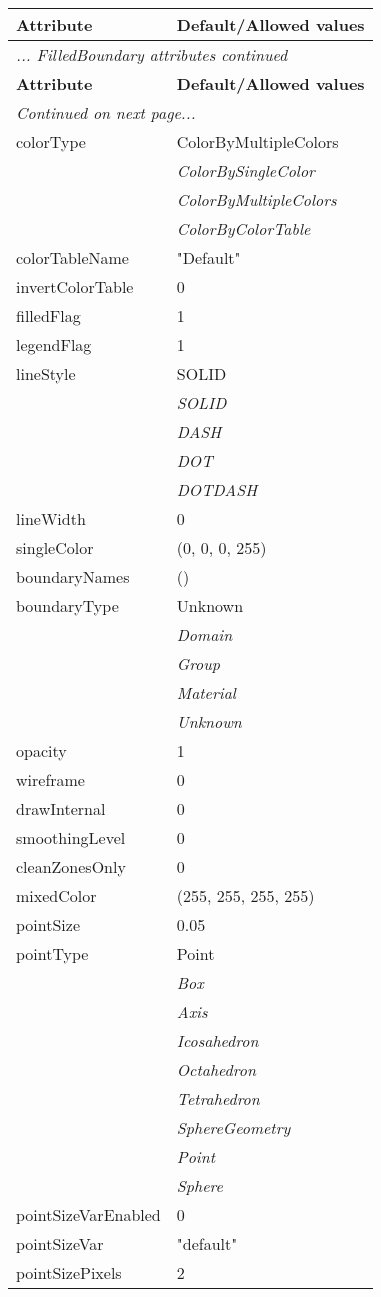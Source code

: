 \documentclass[10pt,a4paper]{report}
\begin{document}
\begin{longtable}{ll}
{\bf Attribute} & {\bf Default/Allowed values} \\
\hline \hline
\endfirsthead
\multicolumn{2}{l}{{\it ... FilledBoundary attributes continued}} \\
{\bf Attribute} & {\bf Default/Allowed values} \\
\hline \hline
\endhead
\hline
\multicolumn{2}{l}{{\it Continued on next page...}} \\
\endfoot
\hline
\endlastfoot

colorType  &  ColorByMultipleColors   \\
 & {\it  ColorBySingleColor} \\
 & {\it  ColorByMultipleColors} \\
 & {\it  ColorByColorTable} \\
colorTableName  &  "Default" \\
invertColorTable  &  0 \\
filledFlag  &  1 \\
legendFlag  &  1 \\
lineStyle  &  SOLID   \\
 & {\it  SOLID} \\
 & {\it  DASH} \\
 & {\it  DOT} \\
 & {\it  DOTDASH} \\
lineWidth  &  0 \\
singleColor  &  (0, 0, 0, 255) \\
boundaryNames  &  () \\
boundaryType  &  Unknown   \\
 & {\it  Domain} \\
 & {\it  Group} \\
 & {\it  Material} \\
 & {\it  Unknown} \\
opacity  &  1 \\
wireframe  &  0 \\
drawInternal  &  0 \\
smoothingLevel  &  0 \\
cleanZonesOnly  &  0 \\
mixedColor  &  (255, 255, 255, 255) \\
pointSize  &  0.05 \\
pointType  &  Point   \\
 & {\it  Box} \\
 & {\it  Axis} \\
 & {\it  Icosahedron} \\
 & {\it  Octahedron} \\
 & {\it  Tetrahedron} \\
 & {\it  SphereGeometry} \\
 & {\it  Point} \\
 & {\it  Sphere} \\
pointSizeVarEnabled  &  0 \\
pointSizeVar  &  "default" \\
pointSizePixels  &  2 \\
\end{longtable}
\end{document}
